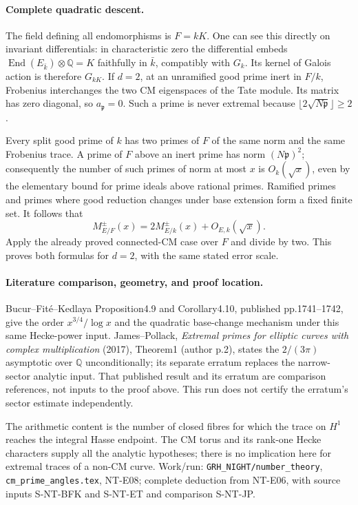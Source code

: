 \paragraph{Complete quadratic descent.}
The field defining all endomorphisms is $F=kK$. One can see this
directly on invariant differentials: in characteristic zero the
differential embeds $\operatorname{End}(E_{\bar k})\otimes\mathbb Q=K$
faithfully in $\bar k$, compatibly with $G_k$. Its kernel of Galois
action is therefore $G_{kK}$. If $d=2$, at an unramified good prime
inert in $F/k$, Frobenius interchanges the two CM eigenspaces of the
Tate module. Its matrix has zero diagonal, so $a_{\mathfrak p}=0$.
Such a prime is never extremal because $\lfloor2\sqrt{N\mathfrak p}\rfloor
\ge2$.

Every split good prime of $k$ has two primes of $F$ of the same norm
and the same Frobenius trace. A prime of $F$ above an inert prime has
norm $(N\mathfrak p)^2$; consequently the number of such primes of
norm at most $x$ is $O_k(\sqrt x)$, even by the elementary bound for
prime ideals above rational primes. Ramified primes and primes where
good reduction changes under base extension form a fixed finite set.
It follows that
\[
 M^\pm_{E/F}(x)=2M^\pm_{E/k}(x)+O_{E,k}(\sqrt x).
\]
Apply the already proved connected-CM case over $F$ and divide by
two. This proves both formulas for $d=2$, with the same stated
error scale.

\paragraph{Literature comparison, geometry, and proof location.}
Bucur--Fit\'e--Kedlaya Proposition4.9 and Corollary4.10, published
pp.1741--1742, give the order $x^{3/4}/\log x$ and the quadratic
base-change mechanism under this same Hecke-power input.
James--Pollack, \emph{Extremal primes for elliptic curves with
complex multiplication} (2017), Theorem1 (author p.2), states the
$2/(3\pi)$ asymptotic over $\mathbb Q$ unconditionally; its separate
erratum replaces the narrow-sector analytic input. That published
result and its erratum are comparison references, not inputs to
the proof above. This run does not certify the erratum's sector
estimate independently.

The arithmetic content is the number of closed fibres for which the
trace on $H^1$ reaches the integral Hasse endpoint. The CM torus and
its rank-one Hecke characters supply all the analytic hypotheses;
there is no implication here for extremal traces of a non-CM curve.
Work/run: \texttt{GRH\_NIGHT/number\_theory},
\texttt{cm\_prime\_angles.tex}, NT-E08; complete deduction from NT-E06,
with source inputs S-NT-BFK and S-NT-ET and comparison S-NT-JP.

